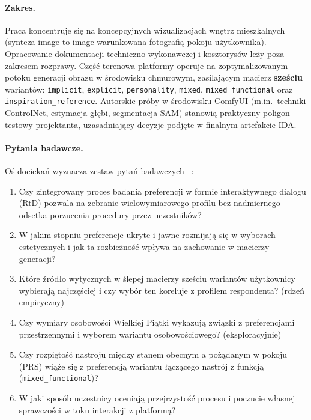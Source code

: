 \paragraph{Zakres.}
Praca koncentruje się na koncepcyjnych wizualizacjach wnętrz mieszkalnych (synteza image-to-image warunkowana fotografią pokoju użytkownika). Opracowanie dokumentacji techniczno-wykonawczej i kosztorysów leży poza zakresem rozprawy.
Część terenowa platformy operuje na zoptymalizowanym potoku generacji obrazu w środowisku chmurowym, zasilającym macierz \textbf{sześciu} wariantów: \texttt{implicit}, \texttt{explicit}, \texttt{personality}, \texttt{mixed}, \texttt{mixed\_functional} oraz \texttt{inspiration\_reference}.
Autorskie próby w środowisku ComfyUI (m.in.\ techniki ControlNet, estymacja głębi, segmentacja SAM) stanowią praktyczny poligon testowy projektanta, uzasadniający decyzje podjęte w finalnym artefakcie IDA.

\paragraph{Pytania badawcze.}
Oś dociekań wyznacza zestaw pytań badawczych --:
\begin{enumerate}
  \item[\RQ{1}] Czy zintegrowany proces badania preferencji w formie interaktywnego dialogu (RtD) pozwala na zebranie wielowymiarowego profilu bez nadmiernego odsetka porzucenia procedury przez uczestników?
  \item[\RQ{2}] W jakim stopniu preferencje ukryte i jawne rozmijają się w wyborach estetycznych i jak ta rozbieżność wpływa na zachowanie w macierzy generacji?
  \item[\RQ{3}] Które źródło wytycznych w ślepej macierzy sześciu wariantów użytkownicy wybierają najczęściej i czy wybór ten koreluje z profilem respondenta? (rdzeń empiryczny)
  \item[\RQ{4}] Czy wymiary osobowości Wielkiej Piątki wykazują związki z preferencjami przestrzennymi i wyborem wariantu osobowościowego? (eksploracyjnie)
  \item[\RQ{5}] Czy rozpiętość nastroju między stanem obecnym a pożądanym w pokoju (PRS) wiąże się z preferencją wariantu łączącego nastrój z funkcją (\texttt{mixed\_functional})?
  \item[\RQ{6}] W jaki sposób uczestnicy oceniają przejrzystość procesu i poczucie własnej sprawczości w toku interakcji z platformą?
\end{enumerate}

